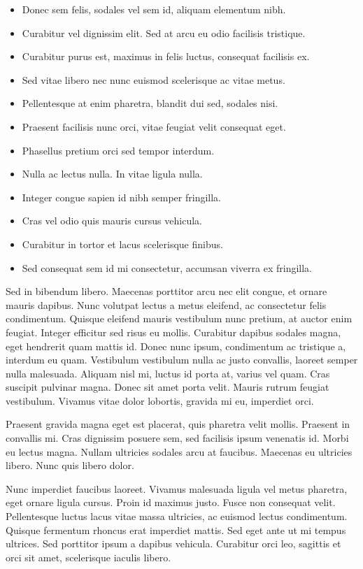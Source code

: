 \documentclass[
]{book}
\begin{document}
\begin{itemize}
\item
  Donec sem felis, sodales vel sem id, aliquam elementum nibh.
\item
  Curabitur vel dignissim elit. Sed at arcu eu odio facilisis tristique.
\item
  Curabitur purus est, maximus in felis luctus, consequat facilisis ex.
\item
  Sed vitae libero nec nunc euismod scelerisque ac vitae metus.
\item
  Pellentesque at enim pharetra, blandit dui sed, sodales nisi.
\item
  Praesent facilisis nunc orci, vitae feugiat velit consequat eget.
\item
  Phasellus pretium orci sed tempor interdum.
\item
  Nulla ac lectus nulla. In vitae ligula nulla.
\item
  Integer congue sapien id nibh semper fringilla.
\item
  Cras vel odio quis mauris cursus vehicula.
\item
  Curabitur in tortor et lacus scelerisque finibus.
\item
  Sed consequat sem id mi consectetur, accumsan viverra ex fringilla.
\end{itemize}

Sed in bibendum libero. Maecenas porttitor arcu nec elit congue, et ornare mauris dapibus. Nunc volutpat lectus a metus eleifend, ac consectetur felis condimentum. Quisque eleifend mauris vestibulum nunc pretium, at auctor enim feugiat. Integer efficitur sed risus eu mollis. Curabitur dapibus sodales magna, eget hendrerit quam mattis id. Donec nunc ipsum, condimentum ac tristique a, interdum eu quam. Vestibulum vestibulum nulla ac justo convallis, laoreet semper nulla malesuada. Aliquam nisl mi, luctus id porta at, varius vel quam. Cras suscipit pulvinar magna. Donec sit amet porta velit. Mauris rutrum feugiat vestibulum. Vivamus vitae dolor lobortis, gravida mi eu, imperdiet orci.

Praesent gravida magna eget est placerat, quis pharetra velit mollis. Praesent in convallis mi. Cras dignissim posuere sem, sed facilisis ipsum venenatis id. Morbi eu lectus magna. Nullam ultricies sodales arcu at faucibus. Maecenas eu ultricies libero. Nunc quis libero dolor.

Nunc imperdiet faucibus laoreet. Vivamus malesuada ligula vel metus pharetra, eget ornare ligula cursus. Proin id maximus justo. Fusce non consequat velit. Pellentesque luctus lacus vitae massa ultricies, ac euismod lectus condimentum. Quisque fermentum rhoncus erat imperdiet mattis. Sed eget ante ut mi tempus ultrices. Sed porttitor ipsum a dapibus vehicula. Curabitur orci leo, sagittis et orci sit amet, scelerisque iaculis libero.
\end{document}
